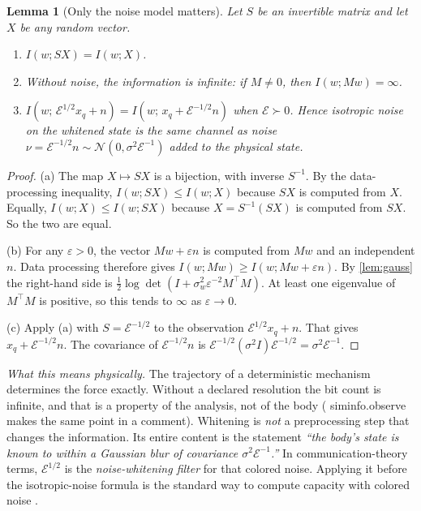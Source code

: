 \documentclass[11pt]{article}
\newtheorem{lemma}[theorem]{Lemma}
\theoremstyle{definition}
\theoremstyle{remark}
\newcommand{\Em}{\mathcal{E}}         %
\newcommand{\codeus}{\textunderscore\allowbreak}
\newcommand{\code}[1]{{\ttfamily\let\_\codeus\hyphenchar\font=-1 #1}}
\newcommand{\phys}[1]{\par\smallskip\noindent\textit{What this means physically.} #1\par}
\begin{document}
\begin{lemma}[Only the noise model matters]\label{lem:noise}
Let $S$ be an invertible matrix and let $X$ be any random vector.
\begin{enumerate}[label=(\alph*)]
  \item $I(w;SX)=I(w;X)$.
  \item Without noise, the information is infinite: if $M\neq0$, then $I(w;Mw)=\infty$.
  \item $I(w;\,\Em^{1/2}x_q+n)=I(w;\,x_q+\Em^{-1/2}n)$ when $\Em\succ0$. Hence isotropic
        noise on the whitened state is \emph{the same channel} as noise
        $\nu=\Em^{-1/2}n\sim\mathcal N(0,\sigma^2\Em^{-1})$ added to the physical state.
\end{enumerate}
\end{lemma}
\begin{proof}
(a) The map $X\mapsto SX$ is a bijection, with inverse $S^{-1}$. By the data-processing
inequality, $I(w;SX)\le I(w;X)$ because $SX$ is computed from $X$. Equally,
$I(w;X)\le I(w;SX)$ because $X=S^{-1}(SX)$ is computed from $SX$. So the two are equal.

(b) For any $\varepsilon>0$, the vector $Mw+\varepsilon n$ is computed from $Mw$ and an
independent $n$. Data processing therefore gives $I(w;Mw)\ge I(w;Mw+\varepsilon n)$. By
\cref{lem:gauss} the right-hand side is
$\frac12\log\det(I+\sigma_w^2\varepsilon^{-2}M^\top M)$. At least one eigenvalue of
$M^\top M$ is positive, so this tends to $\infty$ as $\varepsilon\to0$.

(c) Apply (a) with $S=\Em^{-1/2}$ to the observation $\Em^{1/2}x_q+n$. That gives
$x_q+\Em^{-1/2}n$. The covariance of $\Em^{-1/2}n$ is
$\Em^{-1/2}(\sigma^2I)\Em^{-1/2}=\sigma^2\Em^{-1}$.
\end{proof}

\phys{The trajectory of a deterministic mechanism determines the force exactly. Without a
declared resolution the bit count is infinite, and that is a property of the analysis,
not of the body (\code{sim\_info.\_observe} makes the same point in a comment). Whitening
is \emph{not} a preprocessing step that changes the information. Its entire content is the
statement \emph{``the body's state is known to within a Gaussian blur of covariance
$\sigma^2\Em^{-1}$.''} In communication-theory terms, $\Em^{1/2}$ is the
\emph{noise-whitening filter} for that colored noise. Applying it before the
isotropic-noise formula is the standard way to compute capacity with colored noise
\citep{cover2006elements}.}
\end{document}
